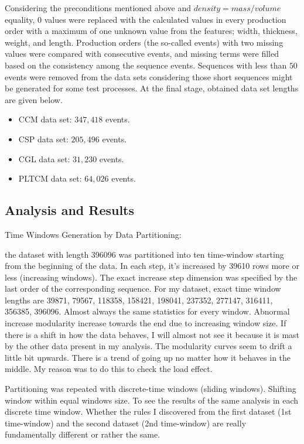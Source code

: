 Considering the preconditions mentioned above and $density = mass/volume$ equality, $0$ values were replaced with the calculated values in every production order with a maximum of one unknown value from the features; width, thickness, weight, and length. Production orders (the so-called events) with two missing values were compared with consecutive events, and missing terms were filled based on the consistency among the sequence events. Sequences with less than $50$ events were removed from the data sets considering those short sequences might be generated for some test processes. At the final stage, obtained data set lengths are given below.
\begin{itemize}
	\item CCM data set: $347,418$ events.
	\item CSP data set: $205,496$ events.
	\item CGL data set: $31,230$ events.
	\item PLTCM data set: $64,026$ events.
\end{itemize}

\subsection*{Analysis and Results}
%

Time Windows Generation by Data Partitioning:

the dataset with length 396096 was partitioned into ten time-window starting from the beginning of the data. In each step, it's increased by 39610 rows more or less (increasing windows). The exact increase step dimension was specified by the last order of the corresponding sequence. For my dataset, exact time window lengths are 39871, 79567, 118358, 158421, 198041, 237352, 277147, 316411, 356385, 396096. Almost always the same statistics for every window. Abnormal increase modularity increase towards the end due to increasing window size. If there is a shift in how the data behaves, I will almost not see it because it is mast by the other data present in my analysis. The modularity curves seem to drift a little bit upwards. There is a trend of going up no matter how it behaves in the middle. My reason was to do this to check the load effect.

Partitioning was repeated with discrete-time windows (sliding windows). Shifting window within equal windows size. To see the results of the same analysis in each discrete time window. Whether the rules I discovered from the first dataset (1st time-window) and the second dataset (2nd time-window) are really fundamentally different or rather the same.

